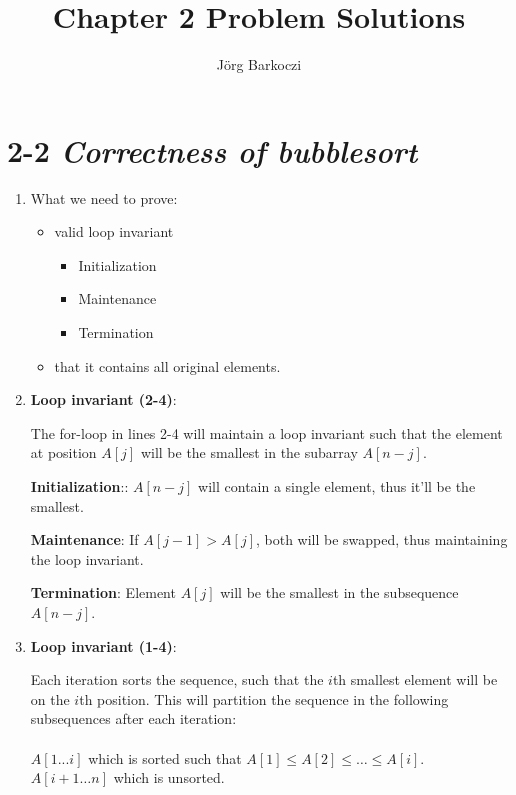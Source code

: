 \documentclass[11pt]{article}
\author{Jörg Barkoczi}
\title{\vspace{-2.0cm}Chapter 2 Problem Solutions}
\date{ }
\begin{document}
\maketitle
\section*{2-2 \textit{Correctness of bubblesort}}
\begin{enumerate}[label=\alph*)]
    \item
        What we need to prove:
        \begin{itemize}
            \item
                valid loop invariant
                \begin{itemize}
                    \item Initialization
                    \item Maintenance
                    \item Termination
                \end{itemize}
            \item
                that it contains all original elements.
        \end{itemize}
    \item
        \textbf{Loop invariant (2-4)}:

        The for-loop in lines 2-4 will maintain a loop invariant
        such that the element at position $A[j]$ will be the smallest
        in the subarray $A[n-j]$.

        \textbf{Initialization}:: $A[n-j]$ will contain a single element, thus it'll be the smallest.

        \textbf{Maintenance}: If $A[j-1] > A[j]$, both will be swapped, thus maintaining the
        loop invariant.
       
        \textbf{Termination}: Element $A[j]$ will be the smallest in the subsequence $A[n-j]$.

   \item
       \textbf{Loop invariant (1-4)}:

        Each iteration sorts the sequence, such that the $i$th smallest element will 
        be on the $i$th position. This will partition the sequence in the following 
        subsequences after each iteration:\\~\\
        $A[1...i]$ which is sorted such that $A[1] \leq A[2] \leq \dots \leq A[i]$.\\
        $A[i+1 \dots n]$ which is unsorted.


\end{enumerate}
\end{document}
